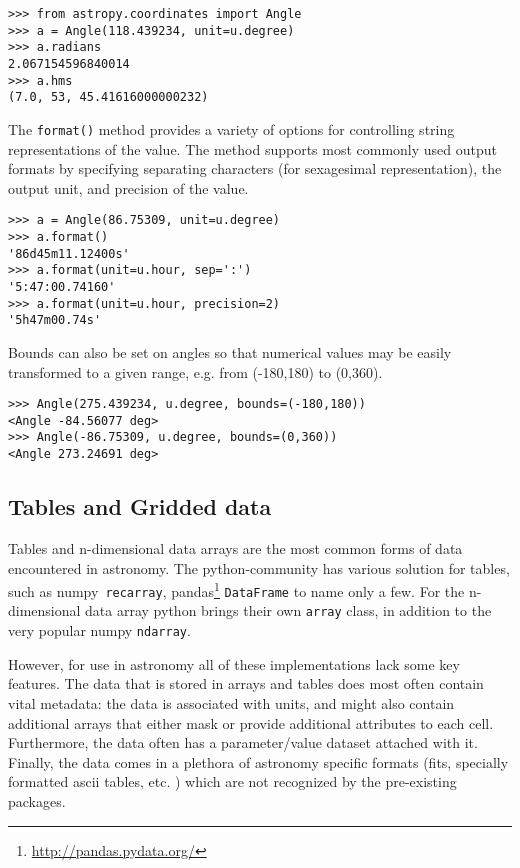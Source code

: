 \documentclass[traditabstract]{aa}
\begin{document}
\begin{verbatim}
>>> from astropy.coordinates import Angle
>>> a = Angle(118.439234, unit=u.degree)
>>> a.radians
2.067154596840014
>>> a.hms
(7.0, 53, 45.41616000000232)
\end{verbatim}

The \texttt{format()} method provides a variety of options for
controlling string representations of the value. The method supports
most commonly used output formats by specifying separating characters
(for sexagesimal representation), the output unit, and precision of
the value.

\begin{verbatim}
>>> a = Angle(86.75309, unit=u.degree)
>>> a.format()
'86d45m11.12400s'
>>> a.format(unit=u.hour, sep=':')
'5:47:00.74160'
>>> a.format(unit=u.hour, precision=2)
'5h47m00.74s'
\end{verbatim}

Bounds can also be set on angles so that numerical
values may be easily transformed to a given range, e.g. from (-180,180) to (0,360).

\begin{verbatim}
>>> Angle(275.439234, u.degree, bounds=(-180,180))
<Angle -84.56077 deg>
>>> Angle(-86.75309, u.degree, bounds=(0,360))
<Angle 273.24691 deg>
\end{verbatim}

\subsection{Tables and Gridded data}


\label{sec:table}

Tables and n-dimensional data arrays are the most common forms of data encountered in astronomy. The \gls{python}-community has various solution for tables, such as \gls{numpy}\ \texttt{recarray}, pandas\footnote{\url{http://pandas.pydata.org/}} \texttt{DataFrame} to name only a few. For the n-dimensional data array python brings their own \texttt{array} class, in addition to the very popular \gls{numpy} \texttt{ndarray}. 

However, for use in astronomy all of these implementations lack some key features. The data that is stored in arrays and tables does most often contain vital metadata: the data is associated with units, and might also contain additional arrays that either mask or provide additional attributes to each cell. Furthermore, the data often has a parameter/value dataset attached with it. 
Finally, the data comes in a plethora of astronomy specific formats (fits, specially formatted ascii tables, etc. ) which are not recognized by the pre-existing packages. 
\end{document}
